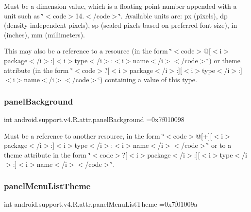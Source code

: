 Must be a dimension value, which is a floating point number appended with a unit such as \char`\"{}$<$code$>$14.\+5sp$<$/code$>$\char`\"{}. Available units are\+: px (pixels), dp (density-\/independent pixels), sp (scaled pixels based on preferred font size), in (inches), mm (millimeters). 

This may also be a reference to a resource (in the form \char`\"{}$<$code$>$@\mbox{[}$<$i$>$package$<$/i$>$\+:\mbox{]}$<$i$>$type$<$/i$>$\+:$<$i$>$name$<$/i$>$$<$/code$>$\char`\"{}) or theme attribute (in the form \char`\"{}$<$code$>$?\mbox{[}$<$i$>$package$<$/i$>$\+:\mbox{]}\mbox{[}$<$i$>$type$<$/i$>$\+:\mbox{]}$<$i$>$name$<$/i$>$$<$/code$>$\char`\"{}) containing a value of this type. \mbox{\label{classandroid_1_1support_1_1v4_1_1R_1_1attr_a7dd979fca50e7d1b3cf5eb905807904d}} 
\subsubsection{\texorpdfstring{panel\+Background}{panelBackground}}
{\footnotesize\ttfamily int android.\+support.\+v4.\+R.\+attr.\+panel\+Background =0x7f010098\hspace{0.3cm}{\ttfamily [static]}}

Must be a reference to another resource, in the form \char`\"{}$<$code$>$@\mbox{[}+\mbox{]}\mbox{[}$<$i$>$package$<$/i$>$\+:\mbox{]}$<$i$>$type$<$/i$>$\+:$<$i$>$name$<$/i$>$$<$/code$>$\char`\"{} or to a theme attribute in the form \char`\"{}$<$code$>$?\mbox{[}$<$i$>$package$<$/i$>$\+:\mbox{]}\mbox{[}$<$i$>$type$<$/i$>$\+:\mbox{]}$<$i$>$name$<$/i$>$$<$/code$>$\char`\"{}. \mbox{\label{classandroid_1_1support_1_1v4_1_1R_1_1attr_a6ba4776dc756edf67526363c1d87c269}} 
\subsubsection{\texorpdfstring{panel\+Menu\+List\+Theme}{panelMenuListTheme}}
{\footnotesize\ttfamily int android.\+support.\+v4.\+R.\+attr.\+panel\+Menu\+List\+Theme =0x7f01009a\hspace{0.3cm}{\ttfamily [static]}}


